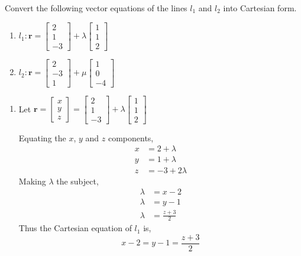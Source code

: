 \documentclass[11pt,a4paper]{book}
\begin{document}
\begin{example}

\renewcommand\arraystretch{.7}

Convert the following vector equations of the lines $l_{1}$ and $l_{2}$
into Cartesian form.

\begin{enumerate}[label=(\alph*)]

\item  $l_{1}:\textbf{r}=\begin{bmatrix}2\\
1\\
-3
\end{bmatrix}+\lambda\begin{bmatrix}1\\
1\\
2
\end{bmatrix}$

\item  $l_{2}:\textbf{r}=\begin{bmatrix}2\\
-3\\
1
\end{bmatrix}+\mu\begin{bmatrix}1\\
0\\
-4
\end{bmatrix}$

\end{enumerate}


\Solution

\begin{minipage}[t]{0.5\textwidth}

\begin{enumerate}[label=(\alph*)]

\item  Let $\textbf{r}=\begin{bmatrix}x\\
y\\
z
\end{bmatrix}=\begin{bmatrix}2\\
1\\
-3
\end{bmatrix}+\lambda\begin{bmatrix}1\\
1\\
2
\end{bmatrix}$

Equating the $x$, $y$ and $z$ components,
\begin{align*}
x & =2+\lambda\\
y & =1+\lambda\\
z & =-3+2\lambda
\end{align*}
Making $\lambda$ the subject,
\begin{align*}
\lambda & =x-2\\
\lambda & =y-1\\
\lambda & =\frac{z+3}{2}
\end{align*}
Thus the Cartesian equation of $l_{1}$ is,
\[
x-2=y-1=\frac{z+3}{2}
\]


\end{enumerate}
\end{minipage}
\end{example}
\end{document}
